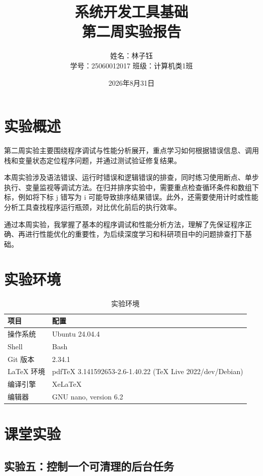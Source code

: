 \documentclass[UTF8,12pt,a4paper]{ctexart}
\title{系统开发工具基础\\第二周实验报告}
\author{姓名：林子钰 \\ 学号：25060012017  班级：计算机类1班}
\date{2026年8月31日}
\begin{document}
\maketitle
\tableofcontents
\newpage

\section{实验概述}

第二周实验主要围绕程序调试与性能分析展开，重点学习如何根据错误信息、调用栈和变量状态定位程序问题，并通过测试验证修复结果。

本周实验涉及语法错误、运行时错误和逻辑错误的排查，同时练习使用断点、单步执行、变量监视等调试方法。在归并排序实验中，需要重点检查循环条件和数组下标，例如将下标 j 错写为 i 可能导致排序结果错误。此外，还需要使用计时或性能分析工具查找程序运行瓶颈，对比优化前后的执行效率。

通过本周实验，我掌握了基本的程序调试和性能分析方法，理解了先保证程序正确、再进行性能优化的重要性，为后续深度学习和科研项目中的问题排查打下基础。



\section{实验环境}

\begin{table}[H]
    \centering
    \caption{实验环境}
    \label{tab:environment}
    \begin{tabular}{ll}
        \toprule
        项目 & 配置 \\
        \midrule
        操作系统 & Ubuntu 24.04.4 \\
        Shell & Bash \\
        Git 版本 & 2.34.1 \\
        LaTeX 环境 & pdfTeX 3.141592653-2.6-1.40.22 (TeX Live 2022/dev/Debian)
 \\
        编译引擎 & XeLaTeX \\
        编辑器 & GNU nano, version 6.2 \\
        \bottomrule
    \end{tabular}
\end{table}

\section{课堂实验}

\subsection{实验五：控制一个可清理的后台任务}
\end{document}
